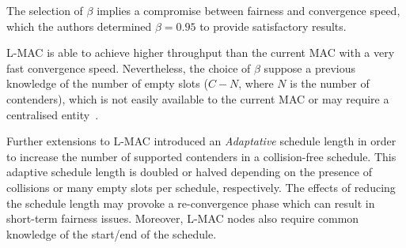 The selection of $\beta$ implies a compromise between fairness and convergence speed, which the authors determined $\beta=0.95$ to provide satisfactory results.

L-MAC is able to achieve higher throughput than the current MAC with a very fast convergence speed. Nevertheless, the choice of $\beta$ suppose a previous knowledge of the number of empty slots ($C-N$, where $N$ is the number of contenders), which is not easily available to the current MAC or may require a centralised entity~\cite{barcelo2011tcf}.

Further extensions to L-MAC introduced an \emph{Adaptative} schedule length in order to increase the number of supported contenders in a collision-free schedule. This adaptive schedule length is doubled or halved depending on the presence of collisions or many empty slots per schedule, respectively. The effects of reducing the schedule length may provoke a re-convergence phase which can result in short-term fairness issues. Moreover, L-MAC nodes also require common knowledge of the start/end of the schedule.